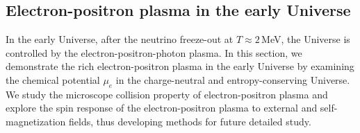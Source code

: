
\subsection{ Electron-positron plasma in the early Universe}\label{section_electron}

In the early Universe, after the neutrino freeze-out at $T\approx 2$\,MeV, the Universe is controlled by the electron-positron-photon plasma. In this section, we demonstrate the rich electron-positron plasma in the early Universe by examining the chemical potential $\mu_e$ in the charge-neutral and entropy-conserving Universe. We study the  microscope collision property of electron-positron plasma and explore the spin response of the electron-positron plasma to external and self-magnetization fields, thus developing methods for future detailed study.








